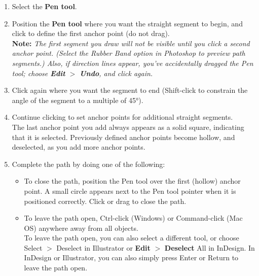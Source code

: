 \documentclass[10pt,a4paper]{article}
\begin{document}
\begin{enumerate}
\item Select the \textbf{Pen tool}.
\item Position the \textbf{Pen tool} where you want the straight segment to begin, and click to define the first anchor point (do not drag).\\
\textbf{Note:}\textit{ The first segment you draw will not be visible until you click a second anchor point. (Select the Rubber Band option in Photoshop to preview path segments.) Also, if direction lines appear, you’ve accidentally dragged the Pen tool; choose \textbf{Edit} $ > $ \textbf{Undo}, and click again.}
\item Click again where you want the segment to end (Shift-click to constrain the angle of the segment to a multiple of 45°).
\item Continue clicking to set anchor points for additional straight segments. \\
The last anchor point you add always appears as a solid square, indicating that it is selected. Previously defined anchor points become hollow, and deselected, as you add more anchor points.
\item Complete the path by doing one of the following:
\begin{itemize}
\item To close the path, position the Pen tool over the first (hollow) anchor point. A small circle appears next to the Pen tool pointer  when it is positioned correctly. Click or drag to close the path.
\item To leave the path open, Ctrl-click (Windows) or Command-click (Mac OS) anywhere away from all objects.\\

To leave the path open, you can also select a different tool, or choose Select $ > $ Deselect in Illustrator or \textbf{Edit} $ > $ \textbf{Deselect} All in InDesign. In InDesign or Illustrator, you can also simply press Enter or Return to leave the path open.
\end{itemize}
\end{enumerate}
\end{document}
